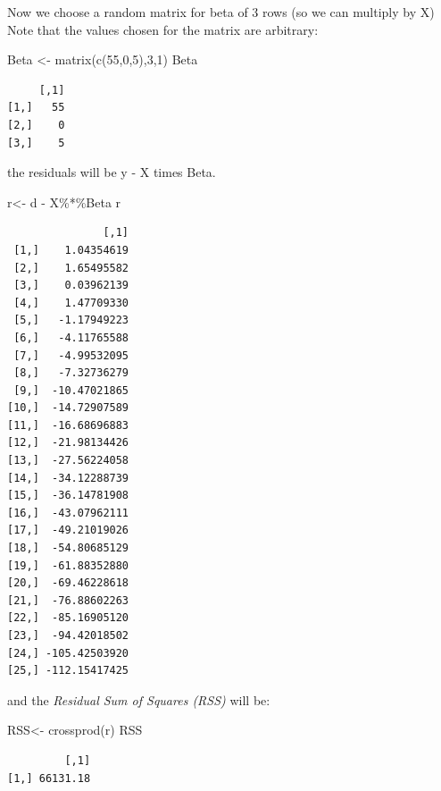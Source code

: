 \documentclass[
  letterpaper,
  DIV=11,
  numbers=noendperiod]{scrartcl}
\newenvironment{Shaded}{\begin{snugshade}}{\end{snugshade}}
\newcommand{\DecValTok}[1]{\textcolor[rgb]{0.68,0.00,0.00}{#1}}
\newcommand{\FunctionTok}[1]{\textcolor[rgb]{0.28,0.35,0.67}{#1}}
\newcommand{\NormalTok}[1]{\textcolor[rgb]{0.00,0.23,0.31}{#1}}
\newcommand{\OtherTok}[1]{\textcolor[rgb]{0.00,0.23,0.31}{#1}}
\newcommand{\SpecialCharTok}[1]{\textcolor[rgb]{0.37,0.37,0.37}{#1}}
\begin{document}
Now we choose a random matrix for beta of 3 rows (so we can multiply by
X) Note that the values chosen for the matrix are arbitrary:

\begin{Shaded}
\begin{Highlighting}[]
\NormalTok{Beta }\OtherTok{\textless{}{-}} \FunctionTok{matrix}\NormalTok{(}\FunctionTok{c}\NormalTok{(}\DecValTok{55}\NormalTok{,}\DecValTok{0}\NormalTok{,}\DecValTok{5}\NormalTok{),}\DecValTok{3}\NormalTok{,}\DecValTok{1}\NormalTok{)}
\NormalTok{Beta}
\end{Highlighting}
\end{Shaded}

\begin{verbatim}
     [,1]
[1,]   55
[2,]    0
[3,]    5
\end{verbatim}

the residuals will be y - X times Beta.

\begin{Shaded}
\begin{Highlighting}[]
\NormalTok{r}\OtherTok{\textless{}{-}}\NormalTok{ d }\SpecialCharTok{{-}}\NormalTok{ X}\SpecialCharTok{\%*\%}\NormalTok{Beta}
\NormalTok{r}
\end{Highlighting}
\end{Shaded}

\begin{verbatim}
               [,1]
 [1,]    1.04354619
 [2,]    1.65495582
 [3,]    0.03962139
 [4,]    1.47709330
 [5,]   -1.17949223
 [6,]   -4.11765588
 [7,]   -4.99532095
 [8,]   -7.32736279
 [9,]  -10.47021865
[10,]  -14.72907589
[11,]  -16.68696883
[12,]  -21.98134426
[13,]  -27.56224058
[14,]  -34.12288739
[15,]  -36.14781908
[16,]  -43.07962111
[17,]  -49.21019026
[18,]  -54.80685129
[19,]  -61.88352880
[20,]  -69.46228618
[21,]  -76.88602263
[22,]  -85.16905120
[23,]  -94.42018502
[24,] -105.42503920
[25,] -112.15417425
\end{verbatim}

and the \emph{Residual Sum of Squares (RSS)} will be:

\begin{Shaded}
\begin{Highlighting}[]
\NormalTok{RSS}\OtherTok{\textless{}{-}} \FunctionTok{crossprod}\NormalTok{(r)}
\NormalTok{RSS}
\end{Highlighting}
\end{Shaded}

\begin{verbatim}
         [,1]
[1,] 66131.18
\end{verbatim}
\end{document}
